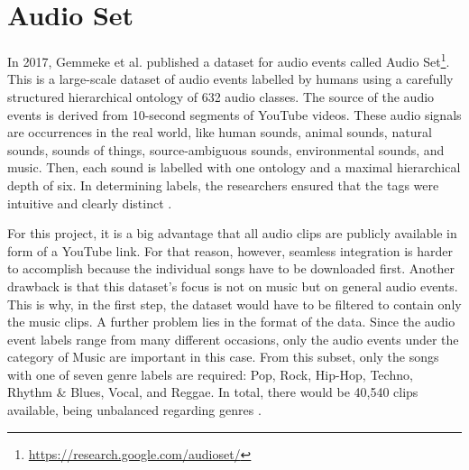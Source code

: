   \section{Audio Set} \label{sec:audio_set}
    In 2017, Gemmeke et al. published a dataset for audio events called Audio Set\footnote{\url{https://research.google.com/audioset/}}. This is a large-scale dataset of audio events labelled by humans using a carefully structured hierarchical ontology of 632 audio classes. The source of the audio events is derived from 10-second segments of YouTube videos. These audio signals are occurrences in the real world, like human sounds, animal sounds, natural sounds, sounds of things, source-ambiguous sounds, environmental sounds, and music. Then, each sound is labelled with one ontology and a maximal hierarchical depth of six. In determining labels, the researchers ensured that the tags were intuitive and clearly distinct \cite{gemmeke2017}. \par
    For this project, it is a big advantage that all audio clips are publicly available in form of a YouTube link. For that reason, however, seamless integration is harder to accomplish because the individual songs have to be downloaded first. Another drawback is that this dataset's focus is not on music but on general audio events. This is why, in the first step, the dataset would have to be filtered to contain only the music clips. A further problem lies in the format of the data. Since the audio event labels range from many different occasions, only the audio events under the category of Music are important in this case. From this subset, only the songs with one of seven genre labels are required: Pop, Rock, Hip-Hop, Techno, Rhythm \& Blues, Vocal, and Reggae. In total, there would be 40,540 clips available, being unbalanced regarding genres \cite{bahuleyan2018music}.

